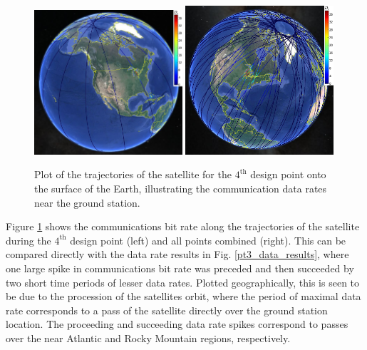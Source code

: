 \documentclass[]{aiaa-tc} %
\begin{document}
         \begin{figure}[!htb]
            \centering
            \includegraphics[width=0.49\textwidth]{images/pt3_gearth3}
            \includegraphics[width=0.49\textwidth]{images/allpts_gearth2}
            \caption{Plot of the trajectories of the satellite
            for the $4^{\textrm{th}}$ design point onto the surface of the Earth, illustrating the
            communication data rates near the ground station.
            \label{fig:trajectories1}
            }
        \end{figure}


        Figure \ref{fig:trajectories1} shows the communications bit rate along the trajectories of the
        satellite during the $4^{\textrm{th}}$ design point (left) and all points combined (right). 
        This can be compared directly with the data rate results in 
        Fig. \ref{pt3_data_results}, where one large spike in communications
        bit rate was preceded and then succeeded by two short time periods of lesser
        data rates. Plotted geographically, this is seen to be due to the procession of
        the satellites orbit, where the period of maximal data rate corresponds to a
        pass of the satellite directly over the ground station location. The proceeding and
        succeeding data rate spikes correspond to passes over the near Atlantic and
        Rocky Mountain regions, respectively.
\end{document}
